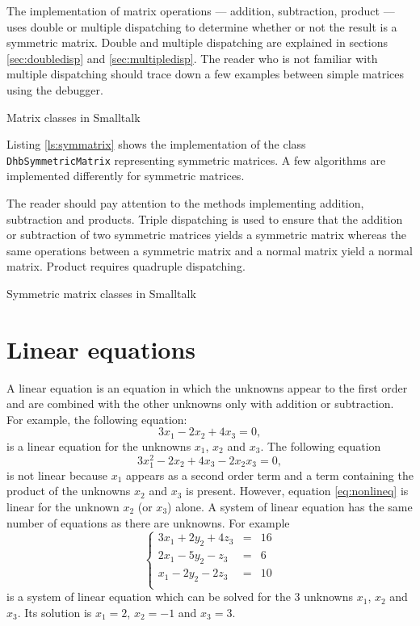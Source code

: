 \documentclass[twoside]{book}
\begin{document}
The implementation of matrix operations --- addition, subtraction,
product --- uses double or multiple dispatching to determine
whether or not the result is a symmetric matrix. Double and
multiple dispatching are explained in sections
\ref{sec:doubledisp} and \ref{sec:multipledisp}. The reader who is
not familiar with multiple dispatching should trace down a few
examples between simple matrices using the debugger.
\begin{listing} Matrix classes in Smalltalk \label{ls:matrix}

\end{listing}
Listing \ref{ls:symmatrix} shows the implementation of the class
{\tt DhbSymmetricMatrix} representing symmetric matrices. A few
algorithms are implemented differently for symmetric matrices.

The reader should pay attention to the methods implementing
addition, subtraction and products. Triple dispatching is used to
ensure that the addition or subtraction of two symmetric matrices
yields a symmetric matrix whereas the same operations between a
symmetric matrix and a normal matrix yield a normal matrix.
Product requires quadruple dispatching.
\begin{listing} Symmetric matrix classes in Smalltalk \label{ls:symmatrix}

\end{listing}




\section{Linear equations}
\label{sec:lineqs} A linear equation is an equation in which the
unknowns appear to the first order and are combined with the other
unknowns only with addition or subtraction. For example, the
following equation:
\begin{equation}
  3x_1-2x_2+4x_3=0,
\end{equation}
is a linear equation for the unknowns $x_1$, $x_2$ and $x_3$. The
following equation
\begin{equation}
\label{eq:nonlineq}
  3x_1^2-2x_2+4x_3 - 2 x_2 x_3=0,
\end{equation}
is not linear because $x_1$ appears as a second order term and a
term containing the product of the unknowns $x_2$ and $x_3$ is
present. However, equation \ref{eq:nonlineq} is linear for the
unknown $x_2$ (or $x_3$) alone. A system of linear equation has
the same number of equations as there are unknowns. For example
\begin{equation}
\label{eq:lineqex}
  \left\{
  \begin{array}{lcr}
  3x_1+2y_2+4z_3&=&16\\
  2x_1-5y_2-z_3&=&6\\
  x_1-2y_2-2z_3&=&10\\
\end{array}\right.
\end{equation}
is a system of linear equation which can be solved for the 3
unknowns $x_1$, $x_2$ and $x_3$. Its solution is $x_1=2$, $x_2=-1$
and $x_3=3$.
\end{document}
